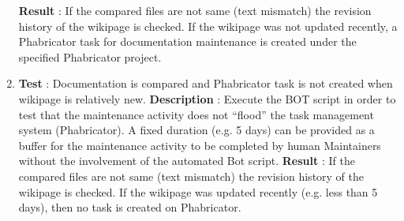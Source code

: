 \begin{enumerate}
\newline 
\newline \textbf{Result} : If the compared files are not same (text mismatch) the revision history of the wikipage is checked. If the wikipage was not updated recently, a Phabricator task for documentation maintenance is created under the specified Phabricator project.
\newline
\item \textbf{Test} : Documentation is compared and Phabricator task is not created when wikipage is relatively new.
\newline
\newline \textbf{Description} : Execute the BOT script in order to test that the maintenance activity does not \enquote{flood} the task management system (Phabricator). A fixed duration (e.g. 5 days) can be provided as a buffer for the maintenance activity to be completed by human Maintainers without the involvement of the automated Bot script.
\newline 
\newline \textbf{Result} : If the compared files are not same (text mismatch) the revision history of the wikipage is checked. If the wikipage was updated recently (e.g. less than 5 days), then no task is created on Phabricator.
\newline
\end{enumerate}

